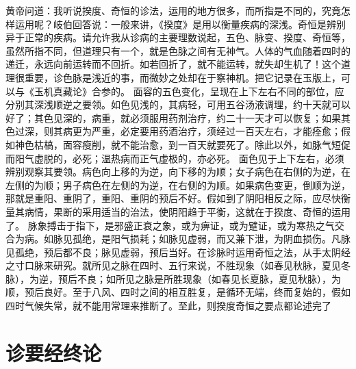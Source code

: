 \documentclass[12pt,UTF8]{ctexbook}
\begin{document}
黄帝问道：我听说揆度、奇恒的诊法，运用的地方很多，而所指是不同的，究竟怎样运用呢？岐伯回答说：一般来讲，《揆度》是用以衡量疾病的深浅。奇恒是辨别异于正常的疾病。请允许我从诊病的主要理数说起，五色、脉变、揆度、奇恒等，虽然所指不同，但道理只有一个，就是色脉之间有无神气。人体的气血随着四时的递迁，永远向前运转而不回折。如若回折了，就不能运转，就失却生机了！这个道理很重要，诊色脉是浅近的事，而微妙之处却在于察神机。把它记录在玉版上，可以与《玉机真藏论》合参的。
面容的五色变化，呈现在上下左右不同的部位，应分别其深浅顺逆之要领。如色见浅的，其病轻，可用五谷汤液调理，约十天就可以好了；其色见深的，病重，就必须服用药剂治疗，约二十一天才可以恢复；如果其色过深，则其病更为严重，必定要用药酒治疗，须经过一百天左右，才能痊愈；假如神色枯槁，面容瘦削，就不能治愈，到一百天就要死了。除此以外，如脉气短促而阳气虚脱的，必死；温热病而正气虚极的，亦必死。
面色见于上下左右，必须辨别观察其要领。病色向上移的为逆，向下移的为顺；女子病色在右侧的为逆，在左侧的为顺；男子病色在左侧的为逆，在右侧的为顺。如果病色变更，倒顺为逆，那就是重阳、重阴了，重阳、重阴的预后不好。假如到了阴阳相反之际，应尽快衡量其病情，果断的采用适当的治法，使阴阳趋于平衡，这就在于揆度、奇恒的运用了。
脉象搏击于指下，是邪盛正衰之象，或为痹证，或为躄证，或为寒热之气交合为病。如脉见孤绝，是阳气损耗；如脉见虚弱，而又兼下泄，为阴血损伤。凡脉见孤绝，预后都不良；脉见虚弱，预后当好。在诊脉时运用奇恒之法，从手太阴经之寸口脉来研究。就所见之脉在四时、五行来说，不胜现象（如春见秋脉，夏见冬脉），为逆，预后不良；如所见之脉是所胜现象（如春见长夏脉，夏见秋脉），为顺，预后良好。至于八风、四时之间的相互胜复，是循环无端，终而复始的，假如四时气候失常，就不能用常理来推断了。至此，则揆度奇恒之要点都论述完了

\chapter{诊要经终论}
\end{document}

